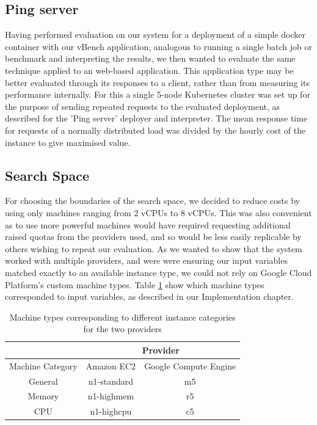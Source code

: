 \documentclass{report}
\begin{document}
\subsection{Ping server}
Having performed evaluation on our system for a deployment of a simple docker container with our vBench application, analogous to running a single batch job or benchmark and interpreting the results, we then wanted to evaluate the same technique applied to an web-based application. This application type may be better evaluated through its responses to a client, rather than from measuring its performance internally. For this a single 5-node Kubernetes cluster was set up for the purpose of sending repeated requests to the evaluated deployment, as described for the 'Ping server' deployer and interpreter. The mean response time for requests of a normally distributed load was divided by the hourly cost of the instance to give maximised value. 

\subsection{Search Space}
For choosing the boundaries of the search space, we decided to reduce costs by using only machines ranging from 2 vCPUs to 8 vCPUs. This was also convenient as to use more powerful machines would have required requesting additional raised quotas from the providers used, and so would be less easily replicable by others wishing to repeat our evaluation. As we wanted to show that the system worked with multiple providers, and were were ensuring our input variables matched exactly to an available instance type, we could not rely on Google Cloud Platform's custom machine types. Table \ref{tab:instance-types} show which machine types corresponded to input variables, as described in our Implementation chapter. 

\begin{table}[!ht]
\centering
\begin{tabular}{ |c||c|c|  }
 \hline
 & \multicolumn{2}{|c|}{Provider} \\
 \hline
 Machine Category & Amazon EC2 & Google Compute Engine \\
 \hline
 General& n1-standard & m5\\
 Memory & n1-highmem  & r5\\
 CPU    & n1-highcpu  & c5\\
 \hline
\end{tabular}
\caption{Machine types corresponding to different instance categories for the two providers}
\label{tab:instance-types}
\end{table}
\end{document}
